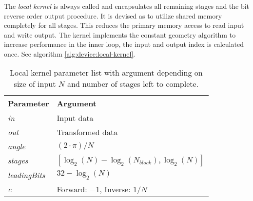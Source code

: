 The \textit{local kernel} is always called and encapsulates all remaining stages and the bit reverse order output procedure. It is devised as to utilize shared memory completely for all stages. This reduces the primary memory access to read input and write output. The kernel implements the constant geometry algorithm to increase performance in the inner loop, the input and output index is calculated once. See algorithm \ref{alg:device:local-kernel}.

\begin{table}
	\centering
	\begin{tabular}{|l|l|}
		\hline
		Parameter & Argument \\ \hline
		\textit{in} & Input data \\ \hline
		\textit{out} & Transformed data \\ \hline
		\textit{angle} & $(2 \cdot \pi)/N$ \\ \hline
		\textit{stages} & $[\log_{2}(N) - \log_{2}(N_{block}), \log_{2}(N)]$ \\ \hline
		\textit{leadingBits} & $32 - \log_{2}(N)$ \\ \hline
		\textit{c} & Forward: $-1$, Inverse: $1/N$ \\ \hline
	\end{tabular}
	\caption{Local kernel parameter list with argument depending on size of input $N$ and number of stages left to complete.}
	\label{tab:local-kernel}
\end{table}

